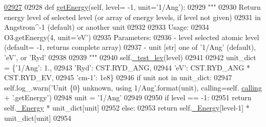 \begin{DoxyCode}
\hypertarget{classpyneb_1_1core_1_1pynebcore_1_1_rec_atom_l02927}{}\hyperlink{classpyneb_1_1core_1_1pynebcore_1_1_rec_atom_a664340029b0a067b459cae45e13d50c5}{02927} 
02928     \textcolor{keyword}{def }\hyperlink{classpyneb_1_1core_1_1pynebcore_1_1_rec_atom_a664340029b0a067b459cae45e13d50c5}{getEnergy}(self, level= -1, unit='1/Ang'):
02929         \textcolor{stringliteral}{"""}
02930 \textcolor{stringliteral}{        Return energy level of selected level (or array of energy levels, if level not given) }
02931 \textcolor{stringliteral}{            in Angstrom^-1 (default) or another unit}
02932 \textcolor{stringliteral}{        }
02933 \textcolor{stringliteral}{        Usage:}
02934 \textcolor{stringliteral}{            O3.getEnergy(4, unit='eV')}
02935 \textcolor{stringliteral}{        Parameters:}
02936 \textcolor{stringliteral}{            - level  selected atomic level (default= -1, returns complete array)}
02937 \textcolor{stringliteral}{            - unit   [str] one of '1/Ang' (default), 'eV', or 'Ryd'    }
02938 \textcolor{stringliteral}{            }
02939 \textcolor{stringliteral}{        """}
02940         self.\hyperlink{classpyneb_1_1core_1_1pynebcore_1_1_rec_atom_a573ceb5efc64c479d5b1fe73373bc033}{\_test\_lev}(level)
02941 
02942         unit\_dict = \{\textcolor{stringliteral}{'1/Ang'}: 1.,
02943                      \textcolor{stringliteral}{'Ryd'}: CST.RYD\_ANG,
02944                      \textcolor{stringliteral}{'eV'}: CST.RYD\_ANG * CST.RYD\_EV,
02945                      \textcolor{stringliteral}{'cm-1'}: 1e8\}
02946         \textcolor{keywordflow}{if} unit \textcolor{keywordflow}{not} \textcolor{keywordflow}{in} unit\_dict:
02947             self.log\_.warn(\textcolor{stringliteral}{'Unit \{0\} unknown, using 1/Ang'}.format(unit), calling=self.
      \hyperlink{classpyneb_1_1core_1_1pynebcore_1_1_rec_atom_a82ec425ebba32b73a5d9ae52717d47c4}{calling} + \textcolor{stringliteral}{'.getEnergy'})
02948             unit = \textcolor{stringliteral}{'1/Ang'}        
02949         
02950         \textcolor{keywordflow}{if} level == -1:
02951             \textcolor{keywordflow}{return} self.\hyperlink{classpyneb_1_1core_1_1pynebcore_1_1_rec_atom_a652daa9311973780fd44f61e09bc650f}{\_Energy} * unit\_dict[unit]
02952         \textcolor{keywordflow}{else}:
02953             \textcolor{keywordflow}{return} self.\hyperlink{classpyneb_1_1core_1_1pynebcore_1_1_rec_atom_a652daa9311973780fd44f61e09bc650f}{\_Energy}[level-1] * unit\_dict[unit]
02954 
    
\end{DoxyCode}
